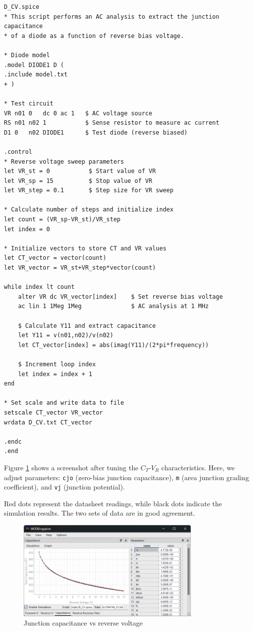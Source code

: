 \documentclass[a4paper,12pt,titlepage]{article}
\begin{document}
\begin{lstlisting}[label=listing12,caption=D\_CV.spice]
D_CV.spice
* This script performs an AC analysis to extract the junction capacitance
* of a diode as a function of reverse bias voltage.

* Diode model
.model DIODE1 D (
.include model.txt
+ )

* Test circuit
VR n01 0   dc 0 ac 1   $ AC voltage source
RS n01 n02 1           $ Sense resistor to measure ac current
D1 0   n02 DIODE1      $ Test diode (reverse biased)

.control
* Reverse voltage sweep parameters
let VR_st = 0           $ Start value of VR
let VR_sp = 15          $ Stop value of VR
let VR_step = 0.1       $ Step size for VR sweep

* Calculate number of steps and initialize index
let count = (VR_sp-VR_st)/VR_step
let index = 0

* Initialize vectors to store CT and VR values
let CT_vector = vector(count)
let VR_vector = VR_st+VR_step*vector(count)

while index lt count
    alter VR dc VR_vector[index]    $ Set reverse bias voltage
    ac lin 1 1Meg 1Meg              $ AC analysis at 1 MHz

    $ Calculate Y11 and extract capacitance
    let Y11 = v(n01,n02)/v(n02)
    let CT_vector[index] = abs(imag(Y11)/(2*pi*frequency))

    $ Increment loop index
    let index = index + 1
end

* Set scale and write data to file
setscale CT_vector VR_vector
wrdata D_CV.txt CT_vector

.endc
.end
\end{lstlisting}

Figure \ref{fig:img06} shows a screenshot after tuning the $C_T$-$V_R$ characteristics.
Here, we adjust parameters: \texttt{cjo} (zero-bias junction capacitance), \texttt{m} (area junction grading coefficient),
and \texttt{vj} (junction potential).

Red dots represent the datasheet readings, while black dots indicate the simulation results.
The two sets of data are in good agreement.

\begin{figure}[htbp]
    \centering
    \includegraphics[width=0.8\textwidth]{images/img06.png}
    \caption{Junction capacitance vs reverse voltage}
    \label{fig:img06}
\end{figure}
\end{document}
